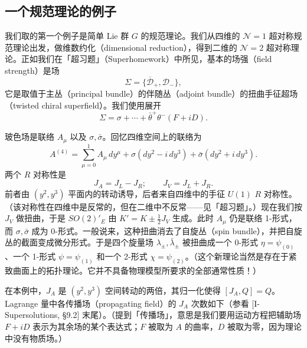 
\subsection{一个规范理论的例子}

我们取的第一个例子是简单 Lie 群 $G$ 的规范理论。我们从四维的 $\mathcal N=1$ 超对称规范理论出发，做维数约化（dimensional reduction），得到二维的 $\mathcal N=2$ 超对称理论。正如我们在「超习题」（Superhomework）中所见，基本的场强（field strength）是场
\[
  \Sigma=\{\overline{\mathcal D}_+,\mathcal D_-\},
\]
它是取值于主丛（principal bundle）的伴随丛（adjoint bundle）的扭曲手征超场（twisted chiral superfield）。我们使用展开
\[
  \Sigma=\sigma+\cdots+\bar\theta^+\theta^-(F+iD).
\]


玻色场是联络 $A_\mu$ 以及 $\sigma,\bar\sigma$。回忆四维空间上的联络为
\[
  A^{(4)}=\sum_{\mu=0}^{1}A_\mu\,dy^\mu+\sigma(dy^2-i\,dy^3)+\bar\sigma(dy^2+i\,dy^3).
\]
两个 $R$ 对称性是
\[
  J_A=J_L-J_R;\qquad J_V=J_L+J_R.
\]
前者由 $(y^2,y^3)$ 平面内的转动诱导，后者来自四维中的手征 $U(1)$ $R$ 对称性。（该对称性在四维中是反常的，但在二维中不反常——见「超习题」。）现在我们按 $J_V$ 做扭曲，于是 $SO(2)'_E$ 由 $K'=K\pm\tfrac12J_V$ 生成。此时 $A_\mu$ 仍是联络 1-形式，而 $\sigma,\bar\sigma$ 成为 0-形式。一般说来，这种扭曲消去了自旋丛（spin bundle），并把自旋丛的截面变成微分形式。于是四个旋量场 $\lambda_\pm,\bar\lambda_\pm$ 被扭曲成一个 0-形式 $\eta=\psi_{(0)}$、一个 1-形式 $\psi=\psi_{(1)}$ 和一个 2-形式 $\chi=\psi_{(2)}$。（这个新理论当然是存在于紧致曲面上的拓扑理论。它并不具备物理模型所要求的全部通常性质！）

在本例中，$J_A$ 是 $(y^2,y^3)$ 空间转动的两倍，其归一化使得 $[J_A,Q]=Q$。Lagrange 量中各传播场（propagating field）的 $J_A$ 次数如下（参看 [I-Supersolutions, §9.2] 末尾）。（提到「传播场」，意思是我们要用运动方程把辅助场 $F+iD$ 表示为其余场的某个表达式；$F$ 被取为 $A$ 的曲率，$D$ 被取为零，因为理论中没有物质场。）

